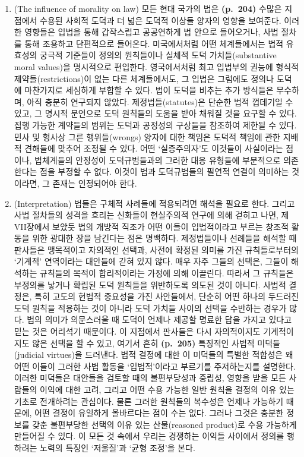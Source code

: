 \begin{enumerate}
\def\labelenumi{(\roman{enumi})}
\setcounter{enumi}{1}
\item
   (The influence of morality on law) 모든
  현대 국가의 법은 \textbf{(p.~204)} 수많은 지점에서 수용된 사회적
  도덕과 더 넓은 도덕적 이상들 양자의 영향을 보여준다. 이러한 영향들은
  입법을 통해 갑작스럽고 공공연하게 법 안으로 들어오거나, 사법 절차를
  통해 조용하고 단편적으로 들어온다. 미국에서처럼 어떤 체계들에서는 법적
  유효성의 궁극적 기준들이 정의의 원칙들이나 실체적 도덕
  가치들(substantive moral values)을 명시적으로 편입한다. 영국에서처럼
  최고 입법부의 권능에 형식적 제약들(restrictions)이 없는 다른
  체계들에서도, 그 입법은 그럼에도 정의나 도덕에 마찬가지로 세심하게
  부합할 수 있다. 법이 도덕을 비추는 추가 방식들은 무수하며, 아직 충분히
  연구되지 않았다. 제정법들(statutes)은 단순한 법적 껍데기일 수 있고, 그
  명시적 문언으로 도덕 원칙들의 도움을 받아 채워질 것을 요구할 수 있다.
  집행 가능한 계약들의 범위는 도덕과 공정성의 구상들을 참조하여 제한될
  수 있다. 민사 및 형사상 그른 행위들(wrongs) 양자에 대한 책임은 도덕적
  책임에 관한 지배적 견해들에 맞추어 조정될 수 있다. 어떤 ‘실증주의자’도
  이것들이 사실이라는 점이나, 법체계들의 안정성이 도덕규범들과의 그러한
  대응 유형들에 부분적으로 의존한다는 점을 부정할 수 없다. 이것이 법과
  도덕규범들의 필연적 연결이 의미하는 것이라면, 그 존재는 인정되어야
  한다.
\item
   (Interpretation) 법들은 구체적 사례들에 적용되려면 해석을
  필요로 한다. 그리고 사법 절차들의 성격을 흐리는 신화들이 현실주의적
  연구에 의해 걷히고 나면, 제VII장에서 보았듯 법의 개방적 직조가 어떤
  이들이 입법적이라고 부르는 창조적 활동을 위한 광대한 장을 남긴다는
  점은 명백하다. 제정법들이나 선례들을 해석할 때 판사들은 맹목적이고
  자의적인 선택과, 사전에 확정된 의미를 가진 규칙들로부터의 ‘기계적’
  연역이라는 대안들에 갇혀 있지 않다. 매우 자주 그들의 선택은, 그들이
  해석하는 규칙들의 목적이 합리적이라는 가정에 의해 이끌린다. 따라서 그
  규칙들은 부정의를 낳거나 확립된 도덕 원칙들을 위반하도록 의도된 것이
  아니다. 사법적 결정은, 특히 고도의 헌법적 중요성을 가진 사안들에서,
  단순히 어떤 하나의 두드러진 도덕 원칙을 적용하는 것이 아니라 도덕
  가치들 사이의 선택을 수반하는 경우가 많다. 법의 의미가 의문스러울 때
  도덕이 언제나 제공할 명료한 답을 가지고 있다고 믿는 것은 어리석기
  때문이다. 이 지점에서 판사들은 다시 자의적이지도 기계적이지도 않은
  선택을 할 수 있고, 여기서 흔히 \textbf{(p.~205)} 특징적인 사법적
  미덕들(judicial virtues)을 드러낸다. 법적 결정에 대한 이 미덕들의
  특별한 적합성은 왜 어떤 이들이 그러한 사법 활동을 ‘입법적’이라고
  부르기를 주저하는지를 설명한다. 이러한 미덕들은 대안들을 검토할 때의
  불편부당성과 중립성, 영향을 받을 모든 사람들의 이익에 대한 고려,
  그리고 어떤 수용 가능한 일반 원칙을 결정의 이유 있는 기초로 전개하려는
  관심이다. 물론 그러한 원칙들의 복수성은 언제나 가능하기 때문에, 어떤
  결정이 유일하게 올바르다는 점이  수는 없다.
  그러나 그것은 충분한 정보를 갖춘 불편부당한 선택의 이유 있는
  산물(reasoned product)로 수용 가능하게 만들어질 수 있다. 이 모든 것
  속에서 우리는 경쟁하는 이익들 사이에서 정의를 행하려는 노력의 특징인
  ‘저울질’과 ‘균형 조정’을 본다.
\end{enumerate}

